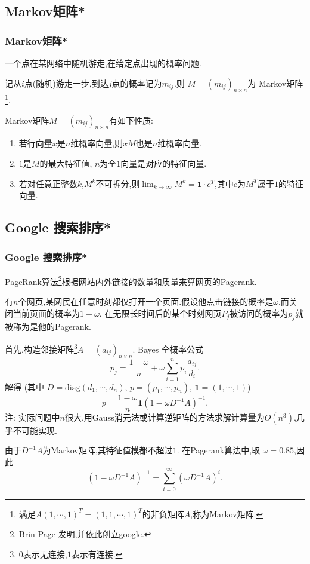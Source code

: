     \subsection{Markov矩阵*}
\begin{frame}\frametitle{Markov矩阵*}
    \begin{question}
    一个点在某网络中随机游走,在给定点出现的概率问题.
    \end{question}

    记从$i$点(随机)游走一步,到达$j$点的概率记为$m_{ij}$.则 $M=(m_{ij})_{n\times n}$为 Markov矩阵\footnote{满足$A(1,\cdots,1)^T=(1,1,\cdots,1)^T$的非负矩阵$A$,称为Markov矩阵.}.

    \begin{theorem} Markov矩阵$M=(m_{ij})_{n\times n}$有如下性质:
    \begin{enumerate}
    \item 若行向量$x$是$n$维概率向量,则$xM$也是$n$维概率向量.
    \item $1$是$M$的最大特征值, $n$为全$1$向量是对应的特征向量.
    \item 若对任意正整数$k$,$M^k$不可拆分,则$\lim_{k\to\infty}M^k=\textbf{1}\cdot c^T$,其中$c$为$M^T$属于$1$的特征向量.
    \end{enumerate}
    \end{theorem}
    \end{frame}





    \subsection{Google 搜索排序*}
\begin{frame}\frametitle{Google 搜索排序*}
    PageRank算法\footnote{Brin-Page 发明,并依此创立google.}根据网站内外链接的数量和质量来算网页的Pagerank.
    \begin{definition}
    有$n$个网页,某网民在任意时刻都仅打开一个页面.假设他点击链接的概率是$\omega$,而关闭当前页面的概率为$1-\omega$. 在无限长时间后的某个时刻网页$P_j$被访问的概率为$p_j$就被称为是他的Pagerank.
    \end{definition}

    首先,构造邻接矩阵\footnote{$0$表示无连接,$1$表示有连接.}$A=(a_{ij})_{n\times n}$.
    Bayes 全概率公式
    \[p_j = \frac{1-\omega}{n} + \omega\sum_{i=1}^n p_i\frac{a_{ij}}{d_i}.\]
    解得 (其中 $D=\mathrm{diag}(d_1,\cdots,d_n)$, $p=(p_1,\cdots,p_n)$, $\textbf{1}=(1,\cdots,1)$)
    \[p=\frac{1-\omega}{n}\textbf{1}\left(1-\omega D^{-1}A\right)^{-1}.\]
    注: 实际问题中$n$很大,用Gauss消元法或计算逆矩阵的方法求解计算量为$O(n^3)$,几乎不可能实现.

    由于$D^{-1}A$为Markov矩阵,其特征值模都不超过$1$. 在Pagerank算法中,取 $\omega=0.85$,因此
    \[\left(1-\omega D^{-1}A\right)^{-1} = \sum_{i=0}^\infty \left(\omega D^{-1}A\right)^i.\]
    \end{frame}





